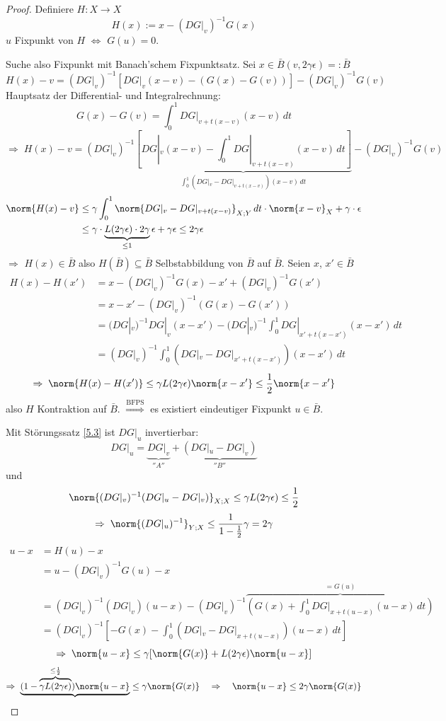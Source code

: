 \begin{proof}
	Definiere $H : X \to X$
	\[
		H(x) := x - (DG|_v)^{-1} G(x)
	\]
	$u$ Fixpunkt von $H$ $\Leftrightarrow$ $G(u) = 0$.

	Suche also Fixpunkt mit Banach'schem Fixpunktsatz. Sei $x \in \bar B(v,2\gamma\epsilon) =: \bar B$
	\[
		H(x) - v = (DG|_v)^{-1} \left[ DG|_v(x-v)-(G(x)-G(v)) \right] - (DG|_v)^{-1}G(v)
	\]
	Hauptsatz der Differential- und Integralrechnung:
	\[
		G(x)-G(v) = \int_0^1 DG|_{v+t(x-v)}(x-v) \, dt
	\]
	\[
		\Rightarrow \; H(x)-v=(DG|_v)^{-1} \underbrace{\left[ DG|_v(x-v)-\int_0^1 DG|_{v+t(x-v)}(x-v) \, dt \right]}_{\int_0^1 (DG|_v-DG|_{v+t(x-v)})(x-v) \, dt} - (DG|_v)^{-1}G(v)
	\]
	\begin{align} \label{eq:5.2}
		\norm{H(x)-v} &\leq \gamma \int_0^1 \norm{DG|_v - DG|_{v+t(x-v)}}_{X;Y} \, dt \cdot \norm{x-v}_X + \gamma \cdot \epsilon\\
		&\leq \gamma \cdot \underbrace{L(2\gamma \epsilon) \cdot 2 \gamma}_{\leq 1} \epsilon + \gamma \epsilon \leq 2\gamma \epsilon \notag
	\end{align}
	$\Rightarrow$ $H(x) \in \bar B$ also $H(\bar B) \subseteq \bar B$ Selbstabbildung von $\bar B$ auf $\bar B$.
	Seien $x$, $x' \in \bar B$
	\begin{align*}
		H(x)-H(x') &= x-(DG|_v)^{-1}G(x)-x'+(DG|_v)^{-1}G(x')\\
		&= x-x'-(DG|_v)^{-1}(G(x)-G(x'))\\
		&= (DG|_v)^{-1} DG|_v(x-x')-(DG|_v)^{-1} \int_0^1 DG|_{x'+t(x-x')}(x-x') \, dt\\
		&= (DG|_v)^{-1} \int_0^1 (DG|_v-DG|_{x'+t(x-x')})(x-x') \, dt \tag{5.2'} \label{eq:5.2'}
	\end{align*}
	\[
		\Rightarrow \; \norm{H(x)-H(x')} \leq \gamma L(2\gamma\epsilon) \norm{x-x'} \leq \frac{1}{2} \norm{x-x'}
	\]
	also $H$ Kontraktion auf $\bar B$.
	$\stackrel{\text{BFPS}}{\Rightarrow}$ es existiert eindeutiger Fixpunkt $u \in \bar B$.

	Mit Störungssatz \ref{5.3} ist $DG|_u$ invertierbar:
	\[
		DG|_u = \underbrace{DG|_v}_{''A''} + \underbrace{(DG|_u-DG|_v)}_{''B''}
	\]
	und
	\[
		\norm{(DG|_v)^{-1}(DG|_u-DG|_v)}_{X;X} \leq \gamma L(2\gamma\epsilon) \leq \frac{1}{2}
	\]
	\[
		\Rightarrow \; \norm{(DG|_u)^{-1}}_{Y;X} \leq \frac{1}{1-\frac{1}{2}}\gamma = 2\gamma
	\]
	\begin{align*}
		u-x &= H(u)-x \\
		&= u-(DG|_v)^{-1}G(u)-x\\
		&=(DG|_v)^{-1}(DG|_v)(u-x)-(DG|_v)^{-1}\overbrace{\left( G(x)+\int_0^1 DG|_{x+t(u-x)}(u-x) \, dt \right)}^{= G(u)}\\
		&=(DG|_v)^{-1} \left[-G(x)-\int_0^1 (DG|_v-DG|_{x+t(u-x)})(u-x) \, dt \right]
	\end{align*}
	\[
		\Rightarrow \; \norm{u-x} \leq \gamma [\norm{G(x)}+L(2\gamma\epsilon)\norm{u-x}]
	\]
	\[
		\Rightarrow \; \underbrace{(1-\overbrace{\gamma L(2\gamma\epsilon)}^{\leq \frac{1}{2}}) \norm{u-x}} \leq \gamma \norm{G(x)} \quad \Rightarrow \quad \norm{u-x} \leq 2 \gamma \norm{G(x)}
	\]
\end{proof}

